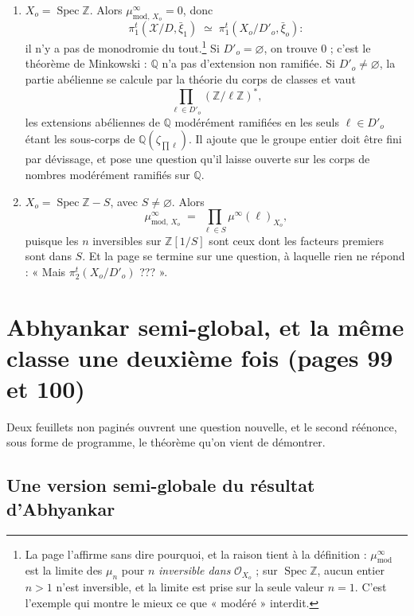 \documentclass[11pt,a4paper]{article}
\begin{document}
\begin{enumerate}
  \item[a)] $X_{o} = \operatorname{Spec}\mathbb{Z}$. Alors
    $\mu^{\infty}_{\mathrm{mod},\,X_{o}} = 0$, donc
    \[
      \pi_{1}^{t}(\mathcal{X}/D, \bar{\xi}_{1}) \;\simeq\;
      \pi_{1}^{t}(X_{o}/D'_{o}, \bar{\xi}_{o}) :
    \]
    il n'y a pas de monodromie du tout.\footnote{La page l'affirme sans dire
    pourquoi, et la raison tient à la définition : $\mu^{\infty}_{\mathrm{mod}}$
    est la limite des $\mu_{n}$ pour $n$ \emph{inversible dans}
    $\mathcal{O}_{X_{o}}$ ; sur $\operatorname{Spec}\mathbb{Z}$, aucun entier
    $n > 1$ n'est inversible, et la limite est prise sur la seule valeur
    $n = 1$. C'est l'exemple qui montre le mieux ce que « modéré » interdit.}
    Si $D'_{o} = \varnothing$, on trouve $0$ ; c'est le théorème de
    Minkowski : $\mathbb{Q}$ n'a pas d'extension non ramifiée. Si
    $D'_{o} \neq \varnothing$, la partie abélienne se calcule par la théorie du
    corps de classes et vaut
    \[
      \prod_{\ell \in D'_{o}} (\mathbb{Z}/\ell\mathbb{Z})^{*} ,
    \]
    les extensions abéliennes de $\mathbb{Q}$ modérément ramifiées en les seuls
    $\ell \in D'_{o}$ étant les sous-corps de
    $\mathbb{Q}(\zeta_{\prod \ell})$. Il ajoute que le groupe entier doit être
    fini par dévissage, et pose une question qu'il laisse ouverte sur les
    corps de nombres modérément ramifiés sur $\mathbb{Q}$.
  \item[b)] $X_{o} = \operatorname{Spec}\mathbb{Z} - S$, avec
    $S \neq \varnothing$. Alors
    \[
      \mu^{\infty}_{\mathrm{mod},\,X_{o}} \;=\;
      \prod_{\ell \in S} \mu^{\infty}(\ell)_{X_{o}} ,
    \]
    puisque les $n$ inversibles sur $\mathbb{Z}[1/S]$ sont ceux dont
    les facteurs premiers sont dans $S$. Et la page se termine sur une
    question, à laquelle rien ne répond : « Mais $\pi_{2}^{t}(X_{o}/D'_{o})$
    ??? ».
\end{enumerate}

\section*{Abhyankar semi-global, et la même classe une deuxième fois (pages 99 et 100)}

Deux feuillets non paginés ouvrent une question nouvelle, et le second
réénonce, sous forme de programme, le théorème qu'on vient de démontrer.

\subsection*{Une version semi-globale du résultat d'Abhyankar}
\end{document}
